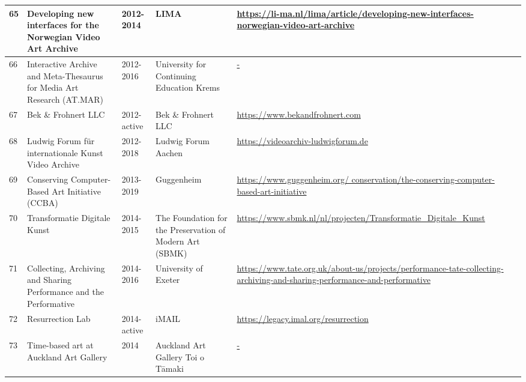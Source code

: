 \begin{longtable}{|p{}|p{}|p{}|p{}|p{}|}
    \scriptsize 65 & \scriptsize Developing new interfaces for the Norwegian Video Art Archive & \scriptsize 2012-2014 & \scriptsize LIMA & \scriptsize \href{https://li-ma.nl/lima/article/developing-new-interfaces-norwegian-video-art-archive}{https://li-ma.nl/lima/article/developing-new-interfaces-norwegian-video-art-archive} \\ \hline
    \scriptsize 66 & \scriptsize Interactive Archive and Meta-Thesaurus for Media Art Research  (AT.MAR) & \scriptsize 2012-2016 & \scriptsize University for Continuing Education Krems & \scriptsize \url{-} \\ \hline
    \scriptsize 67 & \scriptsize Bek \& Frohnert LLC & \scriptsize 2012-active & \scriptsize Bek \& Frohnert LLC & \scriptsize \url{https://www.bekandfrohnert.com} \\ \hline
    \scriptsize 68 & \scriptsize Ludwig Forum für internationale Kunst Video Archive & \scriptsize 2012-2018 & \scriptsize Ludwig Forum Aachen & \scriptsize \url{https://videoarchiv-ludwigforum.de} \\ \hline
    \scriptsize 69 & \scriptsize Conserving Computer-Based Art Initiative (CCBA) & \scriptsize 2013-2019 & \scriptsize Guggenheim & \scriptsize \href{https://www.guggenheim.org/conservation/the-conserving-computer-based-art-initiative}{https://www.guggenheim.org/ conservation/the-conserving-computer-based-art-initiative} \\ \hline
    \scriptsize 70 & \scriptsize Transformatie Digitale Kunst & \scriptsize 2014-2015 & \scriptsize The Foundation for the Preservation of Modern Art (SBMK)  & \scriptsize \url{https://www.sbmk.nl/nl/projecten/Transformatie_Digitale_Kunst} \\ \hline
    \scriptsize 71 & \scriptsize Collecting, Archiving and Sharing Performance and the Performative & \scriptsize 2014-2016 & \scriptsize University of Exeter & \scriptsize \href{https://www.tate.org.uk/about-us/projects/performance-tate-collecting-archiving-and-sharing-performance-and-performative}{https://www.tate.org.uk/about-us/projects/performance-tate-collecting-archiving-and-sharing-performance-and-performative} \\ \hline
    \scriptsize 72 & \scriptsize Resurrection Lab & \scriptsize 2014-active & \scriptsize iMAIL & \scriptsize \url{https://legacy.imal.org/resurrection } \\ \hline
    \scriptsize 73 & \scriptsize Time-based art at Auckland Art Gallery & \scriptsize 2014 & \scriptsize Auckland Art Gallery Toi o Tāmaki & \scriptsize \url{-} \\ \hline

\end{longtable}
